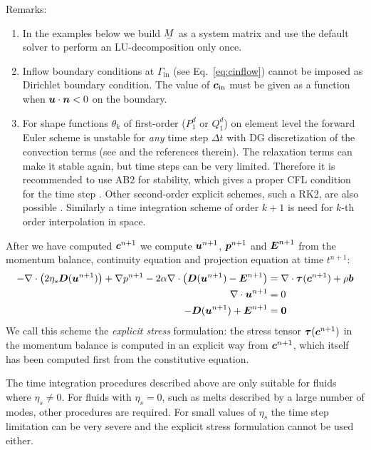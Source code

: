 Remarks:
\begin{enumerate}
   \item In the examples below we build $\mat M$ as a system matrix and use the
         default solver to perform an LU-decomposition only once.
   \item Inflow boundary conditions at $\Gamma_{\text{in}}$ (see
         Eq.~\eqref{eq:cinflow}) cannot be imposed as Dirichlet boundary
         condition. The value of $\boldsymbol{c}_\text{in}$ must be given as a
         function when $\boldsymbol{u}\cdot\boldsymbol{n}<0$ on the boundary.
   \item For shape functions $\theta_k$ of first-order ($P_1^d$ or $Q_1^d$) 
         on element level the forward Euler scheme is unstable for \emph{any}
         time step $\Delta t$ with DG discretization of the convection terms
         (see \cite{Hulsen91} and the references therein).
         The relaxation terms can make it stable again, but time steps can be
         very limited. Therefore it is recommended to use AB2 for stability,
         which gives a proper CFL condition for the time step \cite{Hulsen01}.
         Other second-order explicit schemes, such a RK2, are also possible
         \cite{Hulsen91}.
         Similarly a time integration scheme of order $k+1$ is need for
         $k$-th order interpolation in space.
\end{enumerate}

After we have computed $\boldsymbol{c}^{n+1}$ we compute $\boldsymbol{u}^{n+1}$, 
$\boldsymbol{p}^{n+1}$ and $\boldsymbol{E}^{n+1}$ from the momentum balance,
 continuity equation and projection equation at time $t^{n+1}$:
\begin{align}
      -\nabla\cdot\big(2\eta_s\boldsymbol{D}(\boldsymbol{u}^{n+1})\big) +\nabla p^{n+1} 
  -2\alpha\nabla\cdot\big( \boldsymbol{D}(\boldsymbol{u}^{n+1}) -\boldsymbol{E}^{n+1} \big)
&=\nabla\cdot\boldsymbol{\tau}(\boldsymbol{c}^{n+1})
        + \rho\boldsymbol{b} \label{eq:mombalDG}\\
     \nabla\cdot\boldsymbol{u}^{n+1}&=0\\
   -\boldsymbol{D}(\boldsymbol{u}^{n+1})+\boldsymbol{E}^{n+1} &= \boldsymbol{0}
\end{align}
We call this scheme the \emph{explicit stress} formulation: the stress tensor
$\boldsymbol{\tau}(\boldsymbol{c}^{n+1})$ in the momentum balance is computed in an
explicit way from $\boldsymbol{c}^{n+1}$, which itself has been computed first from the
constitutive equation.

The time integration procedures described above are only suitable for fluids
where $\eta_s\neq0$. For fluids with $\eta_s=0$, such as melts described by a
large number of modes, other procedures are required. For small values of
$\eta_s$ the time step limitation can be very severe and the explicit stress
formulation cannot be used either. 

